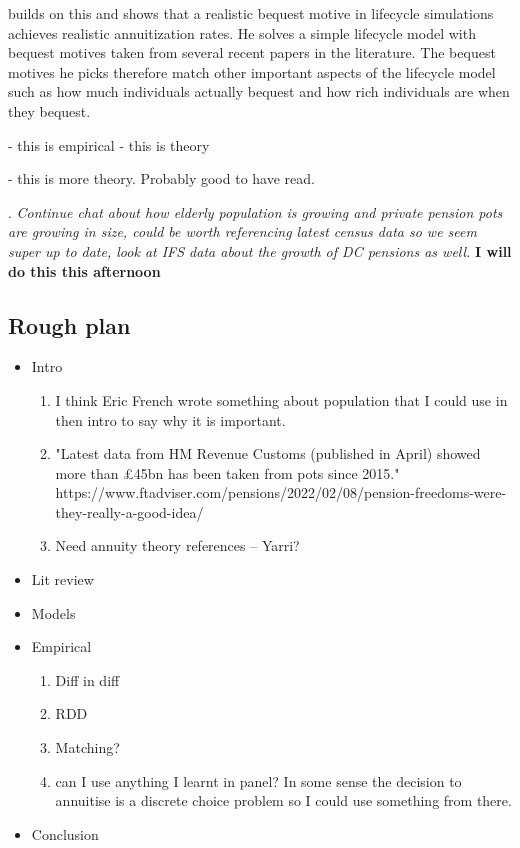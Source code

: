 \documentclass[12pt]{article}
\begin{document}
\cite{lockwood_red_2012} builds on this and shows that a realistic bequest motive in lifecycle simulations achieves
realistic annuitization rates. He solves a simple lifecycle model with bequest motives taken from several recent papers
in the literature. The bequest motives he picks therefore match other important aspects of the lifecycle model such
as how much individuals actually bequest and how rich individuals are when they bequest.






\cite{mitchell_et_al_1999} - this is empirical
\cite{friedman_warshawsky_qje_1990} - this is theory

\cite{friedman_warshawsky_chicago_1988} - this is more theory. Probably good to have read.

\cite{lockwood_aer_2018}



. \textit{Continue
      chat about how elderly population is growing and private pension pots are growing in size, could be worth referencing
      latest census data so we seem super up to date, look at IFS data about the growth of DC pensions as well. }
\textbf{I will do this this afternoon}



\subsection{Rough plan}
\begin{itemize}
      \item Intro
            \begin{enumerate}
                  \item I think Eric French wrote something about population that I could use in then intro to say why it is important.
                  \item "Latest data from HM Revenue Customs (published in April) showed more than £45bn has been taken from pots since 2015."
                        https://www.ftadviser.com/pensions/2022/02/08/pension-freedoms-were-they-really-a-good-idea/

                  \item Need annuity theory references -- Yarri?
            \end{enumerate}
      \item Lit review
      \item Models
      \item Empirical
            \begin{enumerate}
                  \item Diff in diff
                  \item RDD
                  \item Matching?
                  \item can I use anything I learnt in panel?
                        In some sense the decision to annuitise is a discrete choice problem so I could use something from there.
            \end{enumerate}
      \item Conclusion
\end{itemize}




\end{document}
